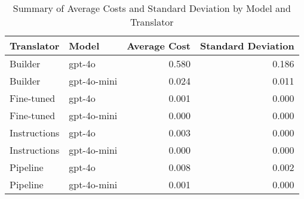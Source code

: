 \begin{table}
\caption{Summary of Average Costs and Standard Deviation by Model and Translator}
\label{tab:average_cost_summary}
\begin{tabular}{llrr}
\toprule
Translator & Model & Average Cost & Standard Deviation \\
\midrule
Builder & gpt-4o & 0.580 & 0.186 \\
Builder & gpt-4o-mini & 0.024 & 0.011 \\
Fine-tuned & gpt-4o & 0.001 & 0.000 \\
Fine-tuned & gpt-4o-mini & 0.000 & 0.000 \\
Instructions & gpt-4o & 0.003 & 0.000 \\
Instructions & gpt-4o-mini & 0.000 & 0.000 \\
Pipeline & gpt-4o & 0.008 & 0.002 \\
Pipeline & gpt-4o-mini & 0.001 & 0.000 \\
\bottomrule
\end{tabular}
\end{table}
